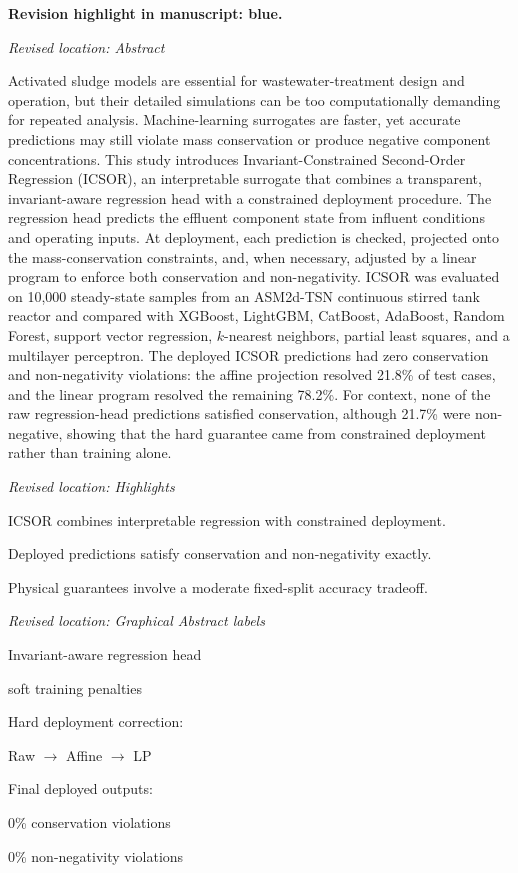 \documentclass[11pt,a4paper]{article}
\newcommand{\revisionnotice}{\par\noindent\textcolor{revisionblue}{\textbf{Revision highlight in manuscript: blue.}}\par}
\newcommand{\excerptlocation}[1]{\par\noindent\textit{Revised location: #1}\par}
\begin{document}
\revisionnotice

\excerptlocation{Abstract}
\begin{revisionexcerpt}
Activated sludge models are essential for wastewater-treatment design and operation, but their detailed simulations can be too computationally demanding for repeated analysis. Machine-learning surrogates are faster, yet accurate predictions may still violate mass conservation or produce negative component concentrations. This study introduces Invariant-Constrained Second-Order Regression (ICSOR), an interpretable surrogate that combines a transparent, invariant-aware regression head with a constrained deployment procedure. The regression head predicts the effluent component state from influent conditions and operating inputs. At deployment, each prediction is checked, projected onto the mass-conservation constraints, and, when necessary, adjusted by a linear program to enforce both conservation and non-negativity. ICSOR was evaluated on 10,000 steady-state samples from an ASM2d-TSN continuous stirred tank reactor and compared with XGBoost, LightGBM, CatBoost, AdaBoost, Random Forest, support vector regression, $k$-nearest neighbors, partial least squares, and a multilayer perceptron. The deployed ICSOR predictions had zero conservation and non-negativity violations: the affine projection resolved 21.8\% of test cases, and the linear program resolved the remaining 78.2\%. For context, none of the raw regression-head predictions satisfied conservation, although 21.7\% were non-negative, showing that the hard guarantee came from constrained deployment rather than training alone.
\end{revisionexcerpt}

\excerptlocation{Highlights}
\begin{revisionexcerpt}
ICSOR combines interpretable regression with constrained deployment.

Deployed predictions satisfy conservation and non-negativity exactly.

Physical guarantees involve a moderate fixed-split accuracy tradeoff.
\end{revisionexcerpt}

\excerptlocation{Graphical Abstract labels}
\begin{revisionexcerpt}
Invariant-aware regression head

soft training penalties

Hard deployment correction:

Raw $\rightarrow$ Affine $\rightarrow$ LP

Final deployed outputs:

0\% conservation violations

0\% non-negativity violations

\end{revisionexcerpt}
\end{document}
